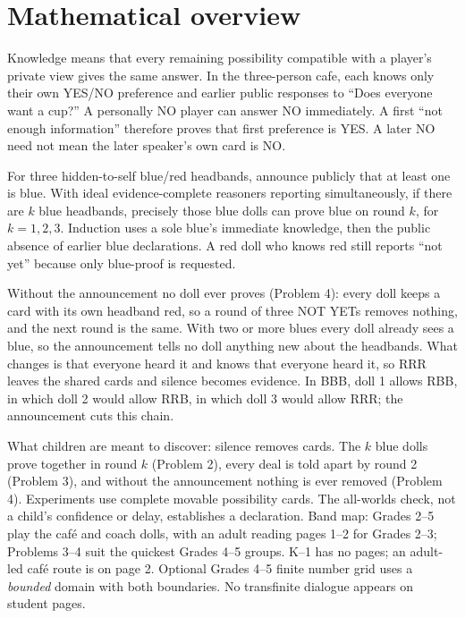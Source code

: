 \documentclass[11pt,letterpaper]{article}
\begin{document}
\section*{Mathematical overview}
Knowledge means that every remaining possibility compatible with a player's private view gives the same answer. In the three-person cafe, each knows only their own YES/NO preference and earlier public responses to ``Does everyone want a cup?'' A personally NO player can answer NO immediately. A first ``not enough information'' therefore proves that first preference is YES. A later NO need not mean the later speaker's own card is NO.

For three hidden-to-self blue/red headbands, announce publicly that at least one is blue. With ideal evidence-complete reasoners reporting simultaneously, if there are $k$ blue headbands, precisely those blue dolls can prove blue on round $k$, for $k=1,2,3$. Induction uses a sole blue's immediate knowledge, then the public absence of earlier blue declarations. A red doll who knows red still reports ``not yet'' because only blue-proof is requested.

Without the announcement no doll ever proves (Problem 4): every doll keeps a card with its own headband red, so a round of three NOT YETs removes nothing, and the next round is the same. With two or more blues every doll already sees a blue, so the announcement tells no doll anything new about the headbands. What changes is that everyone heard it and knows that everyone heard it, so RRR leaves the shared cards and silence becomes evidence. In BBB, doll 1 allows RBB, in which doll 2 would allow RRB, in which doll 3 would allow RRR; the announcement cuts this chain.

What children are meant to discover: silence removes cards. The $k$ blue dolls prove together in round $k$ (Problem 2), every deal is told apart by round 2 (Problem 3), and without the announcement nothing is ever removed (Problem 4). Experiments use complete movable possibility cards. The all-worlds check, not a child's confidence or delay, establishes a declaration. Band map: Grades 2--5 play the café and coach dolls, with an adult reading pages 1--2 for Grades 2--3; Problems 3--4 suit the quickest Grades 4--5 groups. K--1 has no pages; an adult-led café route is on page 2. Optional Grades 4--5 finite number grid uses a \emph{bounded} domain with both boundaries. No transfinite dialogue appears on student pages.
\newpage
\end{document}
